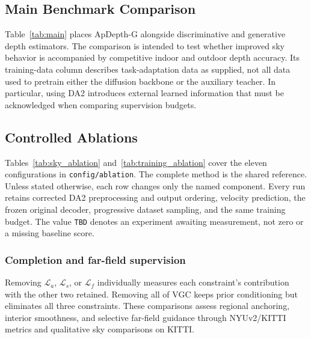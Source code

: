 \documentclass[10pt,journal,a4paper]{IEEEtran}
\newif\ifdraftpaper
\newcommand{\draftnote}[1]{\ifdraftpaper\par\smallskip\noindent\textit{Draft status: #1}\par\smallskip\fi}
\begin{document}
\subsection{Main Benchmark Comparison}
\label{sec:main_results}
Table~\ref{tab:main} places ApDepth-G alongside discriminative and generative depth estimators. The comparison is intended to test whether improved sky behavior is accompanied by competitive indoor and outdoor depth accuracy. Its training-data column describes task-adaptation data as supplied, not all data used to pretrain either the diffusion backbone or the auxiliary teacher. In particular, using DA2 introduces external learned information that must be acknowledged when comparing supervision budgets.

\draftnote{Published baseline rows in Table~\ref{tab:main} follow the comparison reported by Marigold V2~\cite{pavlovic2026marigoldv2}. The ApDepth and ApDepth-G rows are author-supplied records, not yet verified measurements of the current checkpoint. Final interpretation of those two rows and cross-method protocol verification remain pending.}



\subsection{Controlled Ablations}
\label{sec:ablations}
Tables~\ref{tab:sky_ablation} and~\ref{tab:training_ablation} cover the eleven configurations in \texttt{config/ablation}. The complete method is the shared reference. Unless stated otherwise, each row changes only the named component. Every run retains corrected DA2 preprocessing and output ordering, velocity prediction, the frozen original decoder, progressive dataset sampling, and the same training budget. The value \texttt{TBD} denotes an experiment awaiting measurement, not zero or a missing baseline score.

\subsubsection{Completion and far-field supervision}
Removing $\mathcal L_a$, $\mathcal L_s$, or $\mathcal L_f$ individually measures each constraint's contribution with the other two retained. Removing all of VGC keeps prior conditioning but eliminates all three constraints. These comparisons assess regional anchoring, interior smoothness, and selective far-field guidance through NYUv2/KITTI metrics and qualitative sky comparisons on KITTI.
\end{document}
